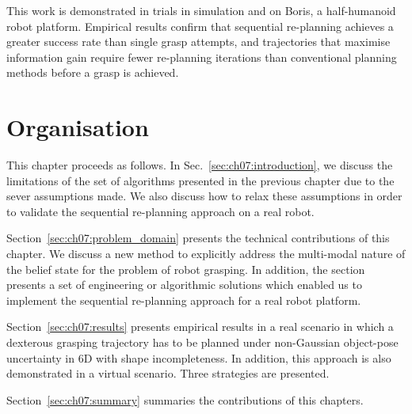 This work is demonstrated in trials in simulation and on Boris, a half-humanoid robot platform. Empirical results confirm that sequential re-planning achieves a greater success rate than single grasp attempts, and trajectories that maximise information gain require fewer re-planning iterations than conventional planning methods before a grasp is achieved.  

\section{Organisation}

This chapter proceeds as follows. In Sec.~\ref{sec:ch07:introduction}, we discuss the limitations of the set of algorithms presented in the previous chapter due to the sever assumptions made. We also discuss how to relax these assumptions in order to validate the sequential re-planning approach on a real robot.

Section~\ref{sec:ch07:problem_domain} presents the technical contributions of this chapter. We discuss a new method to explicitly address the multi-modal nature of the belief state for the problem of robot grasping. In addition, the section presents a set of engineering or algorithmic solutions which enabled us to implement the sequential re-planning approach for a real robot platform.

Section~\ref{sec:ch07:results} presents empirical results in a real scenario in which a dexterous grasping trajectory has to be planned under non-Gaussian object-pose uncertainty in 6D with shape incompleteness. In addition, this approach is also demonstrated in a virtual scenario.  Three strategies are presented.

Section~\ref{sec:ch07:summary} summaries the contributions of this chapters. 


